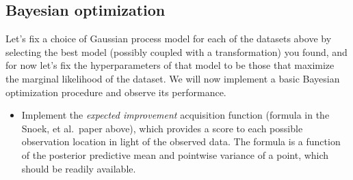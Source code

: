 \documentclass{article}
\begin{document}
\subsection*{Bayesian optimization}

Let's fix a choice of Gaussian process model for each of the datasets above by
selecting the best model (possibly coupled with a transformation) you found, and
for now let's fix the hyperparameters of that model to be those that maximize
the marginal likelihood of the dataset. We will now implement a basic Bayesian
optimization procedure and observe its performance.

\begin{itemize}
\item
  Implement the \emph{expected improvement} acquisition function (formula in the
  Snoek, et al.\ paper above), which provides a score to each possible
  observation location in light of the observed data. The formula is a function
  of the posterior predictive mean and pointwise variance of a point, which
  should be readily available.


\end{itemize}
\end{document}
